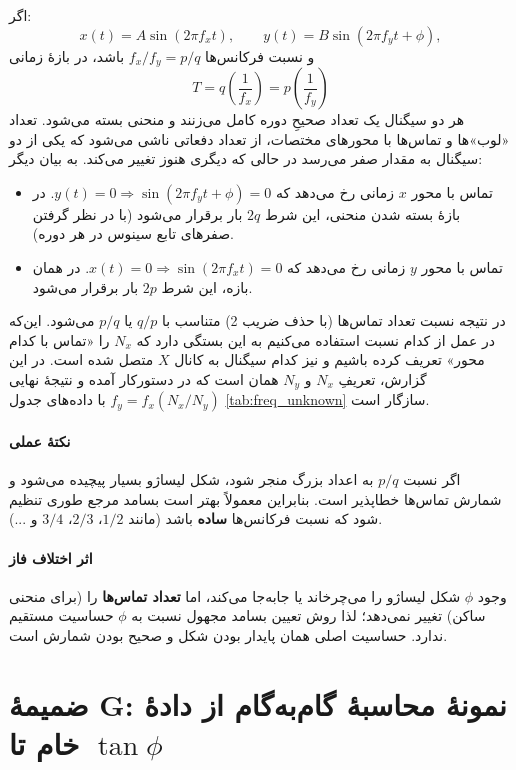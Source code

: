 \documentclass[a4paper, 11pt]{article}
\begin{document}
اگر:
\[
x(t)=A\sin(2\pi f_x t),\qquad y(t)=B\sin(2\pi f_y t+\phi),
\]
و نسبت فرکانس‌ها \(f_x/f_y=p/q\) باشد، در بازهٔ زمانی
\[
T=q\left(\frac{1}{f_x}\right)=p\left(\frac{1}{f_y}\right)
\]
هر دو سیگنال یک تعداد صحیحِ دوره کامل می‌زنند و منحنی بسته می‌شود. تعداد «لوب»‌ها و تماس‌ها با محورهای مختصات، از تعداد دفعاتی ناشی می‌شود که یکی از دو سیگنال به مقدار صفر می‌رسد در حالی که دیگری هنوز تغییر می‌کند. به بیان دیگر:
\begin{itemize}
    \item تماس با محور \(x\) زمانی رخ می‌دهد که \(y(t)=0\Rightarrow \sin(2\pi f_y t+\phi)=0\). در بازهٔ بسته شدن منحنی، این شرط \(2q\) بار برقرار می‌شود (با در نظر گرفتن صفرهای تابع سینوس در هر دوره).
    \item تماس با محور \(y\) زمانی رخ می‌دهد که \(x(t)=0\Rightarrow \sin(2\pi f_x t)=0\). در همان بازه، این شرط \(2p\) بار برقرار می‌شود.
\end{itemize}
در نتیجه نسبت تعداد تماس‌ها (با حذف ضریب 2) متناسب با \(q/p\) یا \(p/q\) می‌شود. این‌که در عمل از کدام نسبت استفاده می‌کنیم به این بستگی دارد که \(N_x\) را «تماس با کدام محور» تعریف کرده باشیم و نیز کدام سیگنال به کانال \(X\) متصل شده است. در این گزارش، تعریفِ \(N_x\) و \(N_y\) همان است که در دستورکار آمده و نتیجهٔ نهایی \(f_y=f_x(N_x/N_y)\) با داده‌های جدول \ref{tab:freq_unknown} سازگار است.

\paragraph{نکتهٔ عملی}
اگر نسبت \(p/q\) به اعداد بزرگ منجر شود، شکل لیساژو بسیار پیچیده می‌شود و شمارش تماس‌ها خطاپذیر است. بنابراین معمولاً بهتر است بسامد مرجع طوری تنظیم شود که نسبت فرکانس‌ها \textbf{ساده} باشد (مانند \(1/2\)، \(2/3\)، \(3/4\) و ...).

\paragraph{اثر اختلاف فاز}
وجود \(\phi\) شکل لیساژو را می‌چرخاند یا جابه‌جا می‌کند، اما \textbf{تعداد تماس‌ها} را (برای منحنی ساکن) تغییر نمی‌دهد؛ لذا روش تعیین بسامد مجهول نسبت به \(\phi\) حساسیت مستقیم ندارد. حساسیت اصلی همان پایدار بودن شکل و صحیح بودن شمارش است.



\section{ضمیمهٔ G: نمونهٔ محاسبهٔ گام‌به‌گام از دادهٔ خام تا \(\tan\phi\)}
\end{document}
